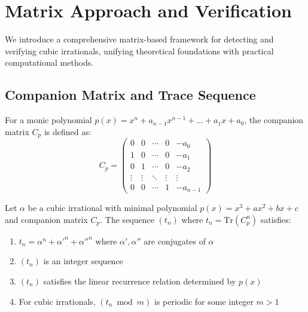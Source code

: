 \section{Matrix Approach and Verification}\label{sec:matrix_approach}

We introduce a comprehensive matrix-based framework for detecting and verifying cubic irrationals, unifying theoretical foundations with practical computational methods.

\subsection{Companion Matrix and Trace Sequence}

\begin{definition}\label{def:companion_matrix}
For a monic polynomial $p(x) = x^n + a_{n-1}x^{n-1} + \ldots + a_1x + a_0$, the companion matrix $C_p$ is defined as:
\begin{equation}
C_p = \begin{pmatrix}
0 & 0 & \cdots & 0 & -a_0 \\
1 & 0 & \cdots & 0 & -a_1 \\
0 & 1 & \cdots & 0 & -a_2 \\
\vdots & \vdots & \ddots & \vdots & \vdots \\
0 & 0 & \cdots & 1 & -a_{n-1}
\end{pmatrix}
\end{equation}
\end{definition}

\begin{theorem}\label{thm:trace_properties}
Let $\alpha$ be a cubic irrational with minimal polynomial $p(x) = x^3 + ax^2 + bx + c$ and companion matrix $C_p$. The sequence $(t_n)$ where $t_n = \text{Tr}(C_p^n)$ satisfies:
\begin{enumerate}
    \item $t_n = \alpha^n + \alpha'^n + \alpha''^n$ where $\alpha', \alpha''$ are conjugates of $\alpha$
    \item $(t_n)$ is an integer sequence
    \item $(t_n)$ satisfies the linear recurrence relation determined by $p(x)$
    \item For cubic irrationals, $(t_n \bmod m)$ is periodic for some integer $m > 1$
\end{enumerate}
\end{theorem}

